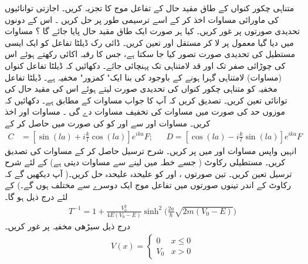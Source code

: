 متناہی چکور  کنواں کے طاق مقید حال کے  تفاعل  موج کا تجزیہ کریں۔ اجازتی  توانائیوں کی ماورائی مساوات اخذ کر کے اسے ترسیمی طور پر حل کریں ۔ اس کے  دونوں تحدیدی صورتوں پر غور کریں۔  کیا ہر صورت ایک طاق مقید حال پایا جائے گا ؟ 
 مساوات  میں دیا گیا   معمول پر  لا کر مستقل  اور  تعین  کریں۔
ڈائی رک ڈیلٹا تفاعل کو ایک ایسی مستطیل کی  تحدیدی صورت تصور کیا  جا سکتا ہے،  جس کا  رقبہ اکائی   رکھتے ہوئے اس کی چوڑائی صفر  تک  اور قد لامتناہی تک پہنچائی جائے۔ دکھائیں کہ  ڈیلٹا تفاعل کنواں (مساوات)   لامتناہی گہرا  ہونے کے باوجود  کی بنا ایک" کمزور" مخفیہ ہے۔   ڈیلٹا تفاعل مخفیہ  کو  متناہی چکور  کنواں کی تحدیدی  صورت لیتے ہوئے اس کی مقید حال کی توانائی تعین کریں۔ تصدیق کریں کہ آپ کا جواب مساوات  کے مطابق ہے۔   دکھائیں کہ موزوں حد کی صورت میں مساوات  کی تخفیف مساوات  دے گی ۔
مساوات  اور  اخذ کریں۔  مساوات  اور سے   اور   کو   کی صورت میں حاصل  کر کے
\begin{align*}
C&=[\sin(la)+i\frac{k}{l}\cos(la)]e^{ika}F; && D=[\cos(la)-i\frac{k}{l}\sin(la)]e^{ika}F
 \end{align*}
 انہیں واپس مساوات   اور  میں پر کریں۔  شرح ترسیل حاصل کر کے مساوات کی تصدیق کریں۔
مستطیلی رکاوٹ ( جسے  خطہ  میں لینے سے مساوات   دیتی ہے)   کے لئے  شرح ترسیل  تعین کریں۔  تین صورتوں   ،
اور  کو علیحدہ علیحدہ حل کریں۔(  آپ دیکھیں گے کہ رکاوٹ کے اندر تینوں صورتوں میں تفاعل موج ایک دوسرے سے مختلف ہوں  گے۔)     کے لئے درج ذیل ہو گا۔
\begin{align*}
T^{-1}=1+\frac{V_{0}^2}{4E(V_{0}-E)}\sinh^{2}\Big(\frac{2a}{\hslash}\sqrt{2m(V_{0}-E)}   \Big) 
\end{align*}
 درج ذیل سیڑھی مخفیہ  پر غور کریں۔
\begin{align*}
V(x)=
\begin{cases}
0 & x\le 0\\
V_{0}&x> 0
\end{cases}
\end{align*}
